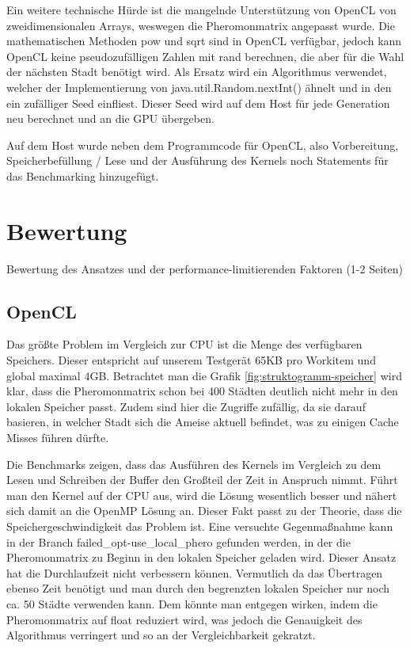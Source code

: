 Ein weitere technische Hürde ist die mangelnde Unterstützung von OpenCL von zweidimensionalen Arrays, weswegen die Pheromonmatrix angepasst wurde.
Die mathematischen Methoden pow und sqrt sind in OpenCL verfügbar, jedoch kann OpenCL keine pseudozufälligen Zahlen mit rand berechnen, die aber für die Wahl der nächsten Stadt benötigt wird.
Als Ersatz wird ein Algorithmus verwendet, welcher der Implementierung von java.util.Random.nextInt() ähnelt und in den ein zufälliger Seed einfliest.
Dieser Seed wird auf dem Host für jede Generation neu berechnet und an die GPU übergeben.

Auf dem Host wurde neben dem Programmcode für OpenCL, also Vorbereitung, Speicherbefüllung / Lese und der Ausführung des Kernels noch Statements für das Benchmarking hinzugefügt.

\section{Bewertung}
Bewertung des Ansatzes und der performance-limitierenden Faktoren (1-2 Seiten)

\subsection{OpenCL}
Das größte Problem im Vergleich zur CPU ist die Menge des verfügbaren Speichers.
Dieser entspricht auf unserem Testgerät 65KB pro Workitem und global maximal 4GB.
Betrachtet man die Grafik \ref{fig:struktogramm-speicher} wird klar, dass die Pheromonmatrix schon bei 400 Städten deutlich nicht mehr in den lokalen Speicher passt.
Zudem sind hier die Zugriffe zufällig, da sie darauf basieren, in welcher Stadt sich die Ameise aktuell befindet, was zu einigen Cache Misses führen dürfte.

Die Benchmarks zeigen, dass das Ausführen des Kernels im Vergleich zu dem Lesen und Schreiben der Buffer den Großteil der Zeit in Anspruch nimmt.
Führt man den Kernel auf der CPU aus, wird die Lösung wesentlich besser und nähert sich damit an die OpenMP Lösung an.
Dieser Fakt passt zu der Theorie, dass die Speichergeschwindigkeit das Problem ist.
Eine versuchte Gegenmaßnahme kann in der Branch failed_opt-use_local_phero gefunden werden, in der die Pheromonmatrix zu Beginn in den lokalen Speicher geladen wird.
Dieser Ansatz hat die Durchlaufzeit nicht verbessern können.
Vermutlich da das Übertragen ebenso Zeit benötigt und man durch den begrenzten lokalen Speicher nur noch ca. 50 Städte verwenden kann.
Dem könnte man entgegen wirken, indem die Pheromonmatrix auf float reduziert wird, was jedoch die Genauigkeit des Algorithmus verringert und so an der Vergleichbarkeit gekratzt.

